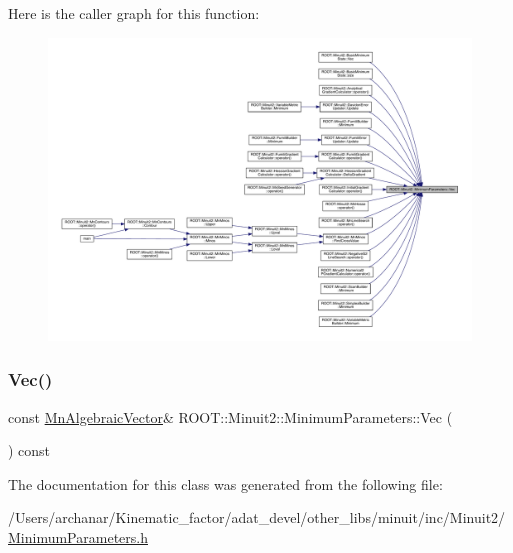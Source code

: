 Here is the caller graph for this function\+:\nopagebreak
\begin{figure}[H]
\begin{center}
\leavevmode
\includegraphics[width=350pt]{db/db8/classROOT_1_1Minuit2_1_1MinimumParameters_ad93c17d14f4ddbc66c91107ff3a80dbe_icgraph}
\end{center}
\end{figure}
\mbox{\label{classROOT_1_1Minuit2_1_1MinimumParameters_ad93c17d14f4ddbc66c91107ff3a80dbe}} 
\subsubsection{\texorpdfstring{Vec()}{Vec()}\hspace{0.1cm}{\footnotesize\ttfamily [2/2]}}
{\footnotesize\ttfamily const \mbox{\hyperlink{namespaceROOT_1_1Minuit2_a62ed97730a1ca8d3fbaec64a19aa11c9}{Mn\+Algebraic\+Vector}}\& R\+O\+O\+T\+::\+Minuit2\+::\+Minimum\+Parameters\+::\+Vec (\begin{DoxyParamCaption}{ }\end{DoxyParamCaption}) const\hspace{0.3cm}{\ttfamily [inline]}}



The documentation for this class was generated from the following file\+:\begin{DoxyCompactItemize}
\item 
/\+Users/archanar/\+Kinematic\+\_\+factor/adat\+\_\+devel/other\+\_\+libs/minuit/inc/\+Minuit2/\mbox{\hyperlink{other__libs_2minuit_2inc_2Minuit2_2MinimumParameters_8h}{Minimum\+Parameters.\+h}}\end{DoxyCompactItemize}
